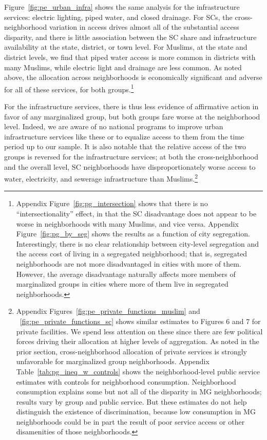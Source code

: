 \documentclass[12pt]{article}
\begin{document}
Figure~\ref{fig:pe_urban_infra} shows the same analysis for the infrastructure services: electric lighting, piped water, and closed drainage. For SCs, the cross-neighborhood variation in access drives almost all of the substantial access disparity, and there is little association between the SC share and infrastructure availability at the state, district, or town level. For Muslims, at the state and district levels, we find that piped water access is more common in districts with many Muslims, while electric light and drainage are less common. As noted above, the allocation across neighborhoods is economically significant and adverse for all of these services, for both groups.\footnote{Appendix Figure~\ref{fig:pg_intersection} shows that there is no ``intersectionality'' effect, in that the SC disadvantage does not appear to be worse in neighborhoods with many Muslims, and vice versa. Appendix Figure~\ref{fig:pg_by_seg} shows the results as a function of city segregation. Interestingly, there is no clear relationship between city-level segregation and the access cost of living in a segregated neighborhood; that is, segregated neighborhoods are not more disadvantaged in cities with more of them. However, the average disadvantage naturally affects more members of marginalized groups in cities where more of them live in segregated neighborhoods.} 

For the infrastructure services, there is thus less evidence of affirmative action in favor of any marginalized group, but both groups fare worse at the neighborhood level. Indeed, we are aware of no national programs to improve urban infrastructure services like these or to equalize access to them from the time period up to our sample. It is also notable that the relative access of the two groups is reversed for the infrastructure services; at both the cross-neighborhood and the overall level, SC neighborhoods have disproportionately worse access to water, electricity, and sewerage infrastructure than Muslims.\footnote{Appendix Figures~\ref{fig:pe_private_functions_muslim} and ~\ref{fig:pe_private_functions_sc} shows similar estimates to Figures 6 and 7 for private facilities. We spend less attention on these since there are few political forces driving their allocation at higher levels of aggregation. As noted in the prior section, cross-neighborhood allocation of private services is strongly unfavorable for marginalized group neighborhoods. Appendix Table~\ref{tab:pg_ineq_w_controls} shows the neighborhood-level public service estimates with controls for neighborhood consumption. Neighborhood consumption explains some but not all of the disparity in MG neighborhoods; results vary by group and public service. But these estimates do not help distinguish the existence of discrimination, because low consumption in MG neighborhoods could be in part the result of poor service access or other disamenities of those neighborhoods.} 
\end{document}
